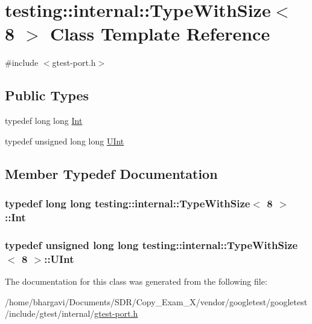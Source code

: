 \hypertarget{classtesting_1_1internal_1_1_type_with_size_3_018_01_4}{}\section{testing\+:\+:internal\+:\+:Type\+With\+Size$<$ 8 $>$ Class Template Reference}
\label{classtesting_1_1internal_1_1_type_with_size_3_018_01_4}


{\ttfamily \#include $<$gtest-\/port.\+h$>$}

\subsection*{Public Types}
\begin{DoxyCompactItemize}
\item 
typedef long long \hyperlink{classtesting_1_1internal_1_1_type_with_size_3_018_01_4_a36d5697e5f5254b0495f13c97d747e36}{Int}
\item 
typedef unsigned long long \hyperlink{classtesting_1_1internal_1_1_type_with_size_3_018_01_4_a747e21c5aee8faf07ec65cd4c3d1ca62}{U\+Int}
\end{DoxyCompactItemize}


\subsection{Member Typedef Documentation}
\subsubsection[{\texorpdfstring{Int}{Int}}]{\setlength{\rightskip}{0pt plus 5cm}typedef long long {\bf testing\+::internal\+::\+Type\+With\+Size}$<$ 8 $>$\+::{\bf Int}}\hypertarget{classtesting_1_1internal_1_1_type_with_size_3_018_01_4_a36d5697e5f5254b0495f13c97d747e36}{}\label{classtesting_1_1internal_1_1_type_with_size_3_018_01_4_a36d5697e5f5254b0495f13c97d747e36}
\subsubsection[{\texorpdfstring{U\+Int}{UInt}}]{\setlength{\rightskip}{0pt plus 5cm}typedef unsigned long long {\bf testing\+::internal\+::\+Type\+With\+Size}$<$ 8 $>$\+::{\bf U\+Int}}\hypertarget{classtesting_1_1internal_1_1_type_with_size_3_018_01_4_a747e21c5aee8faf07ec65cd4c3d1ca62}{}\label{classtesting_1_1internal_1_1_type_with_size_3_018_01_4_a747e21c5aee8faf07ec65cd4c3d1ca62}


The documentation for this class was generated from the following file\+:\begin{DoxyCompactItemize}
\item 
/home/bhargavi/\+Documents/\+S\+D\+R/\+Copy\+\_\+\+Exam\+\_\+X/vendor/googletest/googletest/include/gtest/internal/\hyperlink{gtest-port_8h}{gtest-\/port.\+h}\end{DoxyCompactItemize}
